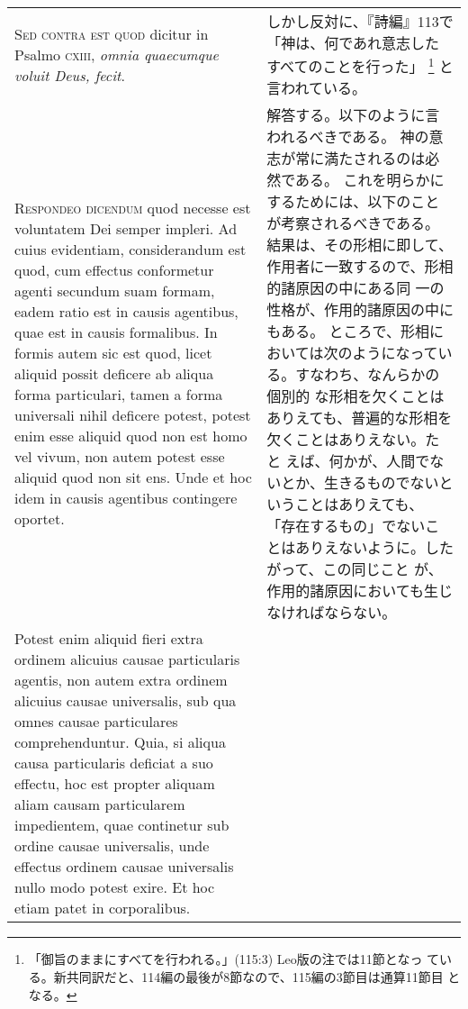 \documentclass[10pt]{jsarticle} %
\begin{document}
\begin{longtable}{p{21em}p{21em}}
\\


{\scshape  Sed contra est quod} dicitur in Psalmo {\scshape cxiii},
{\itshape omnia quaecumque voluit Deus, fecit}.


&

しかし反対に、『詩編』113で「神は、何であれ意志したすべてのことを行った」
 \footnote{「御旨のままにすべてを行われる。」(115:3) Leo版の注では11節となっ
 ている。新共同訳だと、114編の最後が8節なので、115編の3節目は通算11節目
 となる。}
 と言われている。

\\


{\scshape Respondeo dicendum} quod necesse est voluntatem
Dei semper impleri. Ad cuius evidentiam, considerandum est quod, cum
effectus conformetur agenti secundum suam formam, eadem ratio est in
causis agentibus, quae est in causis formalibus. In formis autem sic est
quod, licet aliquid possit deficere ab aliqua forma particulari, tamen a
forma universali nihil deficere potest, potest enim esse aliquid quod
non est homo vel vivum, non autem potest esse aliquid quod non sit
ens. Unde et hoc idem in causis agentibus contingere oportet. 


&

解答する。以下のように言われるべきである。
神の意志が常に満たされるのは必然である。
これを明らかにするためには、以下のことが考察されるべきである。
結果は、その形相に即して、作用者に一致するので、形相的諸原因の中にある同
 一の性格が、作用的諸原因の中にもある。
ところで、形相においては次のようになっている。すなわち、なんらかの個別的
 な形相を欠くことはありえても、普遍的な形相を欠くことはありえない。たと
 えば、何かが、人間でないとか、生きるものでないということはありえても、
 「存在するもの」でないことはありえないように。したがって、この同じこと
 が、作用的諸原因においても生じなければならない。


\\



Potest
enim aliquid fieri extra ordinem alicuius causae particularis agentis,
non autem extra ordinem alicuius causae universalis, sub qua omnes
causae particulares comprehenduntur. Quia, si aliqua causa particularis
deficiat a suo effectu, hoc est propter aliquam aliam causam
particularem impedientem, quae continetur sub ordine causae universalis,
unde effectus ordinem causae universalis nullo modo potest exire. Et hoc
etiam patet in corporalibus. 



&


\end{longtable}
\end{document}
